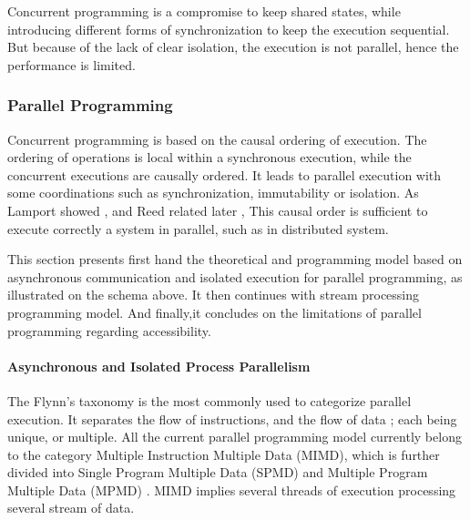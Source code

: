 
Concurrent programming is a compromise to keep shared states, while introducing different forms of synchronization to keep the execution sequential.
But because of the lack of clear isolation, the execution is not parallel, hence the performance is limited.



\subsubsection{Parallel Programming} \label{chapter3:software-performance:parallel-programming}


Concurrent programming is based on the causal ordering of execution.
The ordering of operations is local within a synchronous execution, while the concurrent executions are causally ordered.
It leads to parallel execution with some coordinations such as synchronization, immutability or isolation.
As Lamport showed \cite{Lamport1978}, and Reed related later \cite{Reed2012}, This causal order is sufficient to execute correctly a system in parallel, such as in distributed system.

This section presents first hand the theoretical and programming model based on asynchronous communication and isolated execution for parallel programming, as illustrated on the schema above.
It then continues with stream processing programming model. 
And finally,it concludes on the limitations of parallel programming regarding accessibility. 


\paragraph{Asynchronous and Isolated Process Parallelism}

The Flynn's taxonomy \cite{Flynn1972} is the most commonly used to categorize parallel execution.
It separates the flow of instructions, and the flow of data ; each being unique, or multiple.
All the current parallel programming model currently belong to the category Multiple Instruction Multiple Data (MIMD), which is further divided into Single Program Multiple Data (SPMD) \cite{Auguin1983,Darema1988,Darema2001} and Multiple Program Multiple Data (MPMD) \cite{Chang1997,Chan2004}.
MIMD implies several threads of execution processing several stream of data.

